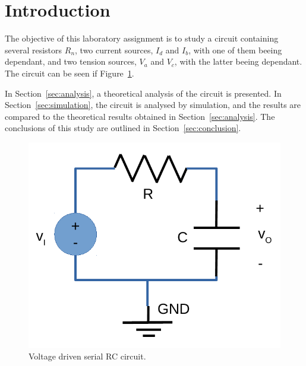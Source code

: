 \section{Introduction}
\label{sec:introduction}

The objective of this laboratory assignment is to study a circuit containing several resistors $R_n$, two current sources, $I_d$ and $I_b$, with one of them beeing dependant, and two tension sources, $V_a$ and $V_c$, with the latter beeing dependant. The circuit can be seen if Figure~\ref{fig:rc}.


In Section~\ref{sec:analysis}, a theoretical analysis of the circuit is
presented. In Section~\ref{sec:simulation}, the circuit is analysed by
simulation, and the results are compared to the theoretical results obtained in
Section~\ref{sec:analysis}. The conclusions of this study are outlined in
Section~\ref{sec:conclusion}.

\begin{figure}[h] \centering
\includegraphics[width=0.4\linewidth]{rc.pdf}
\caption{Voltage driven serial RC circuit.}
\label{fig:rc}
\end{figure}

